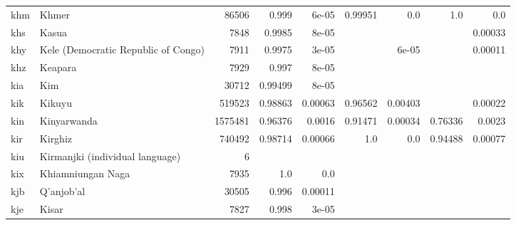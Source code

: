 \documentclass[11pt]{article}
\begin{document}
\begin{table*}[h]
{\begin{tabular}{llrrrrrrr}
khm         & Khmer         & 86506         & 0.999         & 6e-05         & 0.99951         & 0.0         & 1.0         & 0.0         \\

khs         & Kasua         & 7848         & 0.9985         & 8e-05         &          &          &          & 0.00033         \\

khy         & Kele (Democratic Republic of Congo)         & 7911         & 0.9975         & 3e-05         &          & 6e-05         &          & 0.00011         \\

khz         & Keapara         & 7929         & 0.997         & 8e-05         &          &          &          &          \\

kia         & Kim         & 30712         & 0.99499         & 8e-05         &          &          &          &          \\

kik         & Kikuyu         & 519523         & 0.98863         & 0.00063         & 0.96562         & 0.00403         &          & 0.00022         \\

kin         & Kinyarwanda         & 1575481         & 0.96376         & 0.0016         & 0.91471         & 0.00034         & 0.76336         & 0.0023         \\

kir         & Kirghiz         & 740492         & 0.98714         & 0.00066         & 1.0         & 0.0         & 0.94488         & 0.00077         \\

kiu         & Kirmanjki (individual language)         & 6         &          &          &          &          &          &          \\

kix         & Khiamniungan Naga         & 7935         & 1.0         & 0.0         &          &          &          &          \\

kjb         & Q'anjob'al         & 30505         & 0.996         & 0.00011         &          &          &          &          \\

kje         & Kisar         & 7827         & 0.998         & 3e-05         &          &          &          &          \\


\end{tabular}}
\end{table*}
\end{document}
